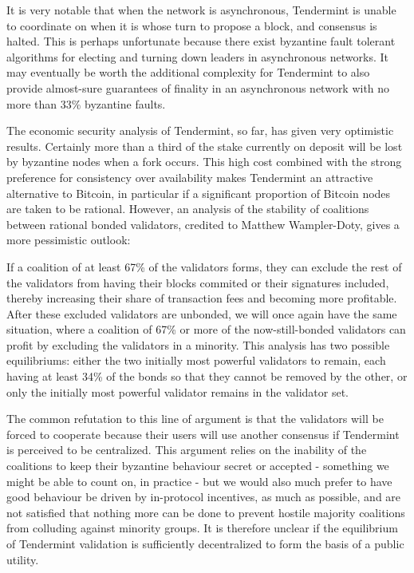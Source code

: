 \documentclass[11pt,a4paper]{article}
\theoremstyle{plain}
\theoremstyle{definition}
\begin{document}
It is very notable that when the network is asynchronous, Tendermint is unable to coordinate on when it is whose turn to propose a block, and consensus is halted. This is perhaps unfortunate because there exist byzantine fault tolerant algorithms for electing and turning down leaders in asynchronous networks. It may eventually be worth the additional complexity for Tendermint to also provide almost-sure guarantees of finality in an asynchronous network with no more than 33\% byzantine faults.

The economic security analysis of Tendermint, so far, has given very optimistic results. Certainly more than a third of the stake currently on deposit will be lost by byzantine nodes when a fork occurs. This high cost combined with the strong preference for consistency over availability makes Tendermint an attractive alternative to Bitcoin, in particular if a significant proportion of Bitcoin nodes are taken to be rational. However, an analysis of the stability of coalitions between rational bonded validators, credited to Matthew Wampler-Doty, gives a more pessimistic outlook:

If a coalition of at least 67\% of the validators forms, they can exclude the rest of the validators from having their blocks commited or their signatures included, thereby increasing their share of transaction fees and becoming more profitable. After these excluded validators are unbonded, we will once again have the same situation, where a coalition of 67\% or more of the now-still-bonded validators can profit by excluding the validators in a minority. This analysis has two possible equilibriums: either the two initially most powerful validators to remain, each having at least 34\% of the bonds so that they cannot be removed by the other, or only the initially most powerful validator remains in the validator set. 

The common refutation to this line of argument is that the validators will be forced to cooperate because their users will use another consensus if Tendermint is perceived to be centralized. This argument relies on the inability of the coalitions to keep their byzantine behaviour secret or accepted - something we might be able to count on, in practice - but we would also much prefer to have good behaviour be driven by in-protocol incentives, as much as possible, and are not satisfied that nothing more can be done to prevent hostile majority coalitions from colluding against minority groups. It is therefore unclear if the equilibrium of Tendermint validation is sufficiently decentralized to form the basis of a public utility.
\end{document}

